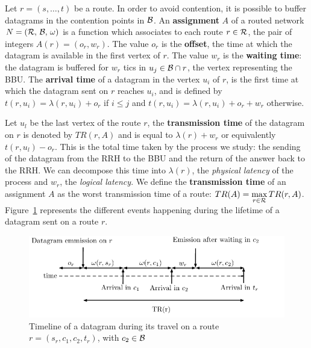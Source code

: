 \documentclass[a4paper,10pt]{journal}
\begin{document}
        Let $r=(s,\dots,t)$ be a route. In order to avoid contention, it is possible to buffer datagrams in the contention points in $\cal{B}$. An \textbf{assignment} $A$ of a routed network $N = (\cal{R},\,\cal{B},\,\omega)$ is a function which associates to each route $r \in \cal{R}$, the pair of integers $A(r) = (o_r,w_r)$.
        The value $o_r$ is the \textbf{offset}, the time at which the datagram is available in the first vertex of $r$. The value $w_r$ is the \textbf{waiting time}: the datagram is buffered 
        for $w_r$ tics in $u_j \in {\cal B} \cap r$, the vertex representing the BBU.
 		The \textbf{arrival time} of a datagram in the vertex $u_i$ of $r$, is the first time at which the datagram sent on $r$ reaches $u_i$, and is defined by $t(r,u_i) = \lambda(r,u_i) + o_r $ if 
 		$i \leq j$ and $t(r,u_i) = \lambda(r,u_i) + o_r + w_r$ otherwise.

 		 Let $u_l$ be the last vertex of the route $r$, the \textbf{transmission time} of the datagram on 
  		$r$ is denoted by $TR(r,A)$ and is equal to $\lambda(r) + w_r$ or equivalently $t(r,u_l) - o_r$. This is the total time taken by the process we study: the sending of the datagram from the RRH to the BBU and the return of the answer back to the RRH. We can decompose this time into $\lambda(r)$, the \emph{physical latency} of the process and $w_r$, the \emph{logical latency}. 
  		We define the \textbf{transmission time} of an assignment $A$ as the worst transmission time of a route: $TR(A) = \displaystyle \max\limits_{r \in {\cal R}} TR(r,A)$. 
        Figure~\ref{fig:datagramtimeline} represents the different events happening during the lifetime  of a datagram  sent on a route $r$.
  		\begin{figure}
  		 \begin{center}
      \includegraphics[width=\textwidth]{time.pdf}
      \end{center}
      \caption{Timeline of a datagram during its travel on a route $r = (s_r,c_1,c_2,t_r)$, with $c_2 \in \cal{B}$}
      \label{fig:datagramtimeline}
  		\end{figure}
\end{document}
